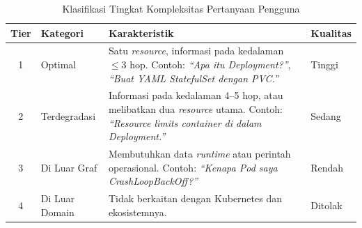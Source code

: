 \captionsetup[table]{justification=raggedright,singlelinecheck=false}
\begin{table}[H]
\centering
\caption{Klasifikasi Tingkat Kompleksitas Pertanyaan Pengguna}
\label{tbl:query_complexity}
\begin{tabularx}{\textwidth}{|c|l|X|l|}
\hline
\textbf{Tier} & \textbf{Kategori} & \textbf{Karakteristik} & \textbf{Kualitas} \\
\hline
1 & Optimal &
  Satu \textit{resource}, informasi pada kedalaman $\leq 3$ hop.
  Contoh: \textit{``Apa itu Deployment?''}, \textit{``Buat YAML StatefulSet dengan PVC.''} &
  Tinggi \\
\hline
2 & Terdegradasi &
  Informasi pada kedalaman 4--5 hop, atau melibatkan dua \textit{resource} utama.
  Contoh: \textit{``Resource limits container di dalam Deployment.''} &
  Sedang \\
\hline
3 & Di Luar Graf &
  Membutuhkan data \textit{runtime} atau perintah operasional.
  Contoh: \textit{``Kenapa Pod saya \textit{CrashLoopBackOff}?''} &
  Rendah \\
\hline
4 & Di Luar Domain &
  Tidak berkaitan dengan Kubernetes dan ekosistemnya. &
  Ditolak \\
\hline
\end{tabularx}
\end{table}
